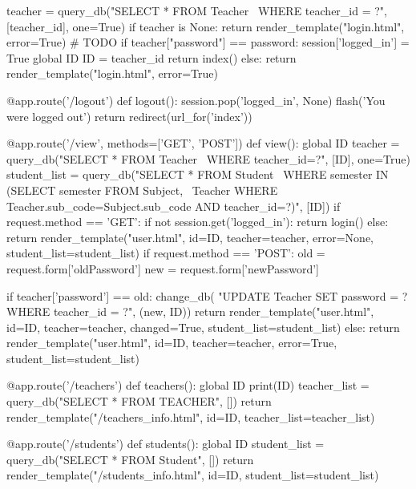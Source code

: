 \begin{python}
        teacher = query_db("SELECT * FROM Teacher \
                                WHERE teacher_id = ?",
                           [teacher_id],  one=True)
        if teacher is None:
            return render_template("login.html", error=True)
            # TODO
        if teacher["password"] == password:
            session['logged_in'] = True
            global ID
            ID = teacher_id
            return index()
        else:
            return render_template("login.html", error=True)


@app.route('/logout')
def logout():
    session.pop('logged_in', None)
    flash('You were logged out')
    return redirect(url_for('index'))


@app.route('/view', methods=['GET', 'POST'])
def view():
    global ID
    teacher = query_db("SELECT * FROM Teacher \
                         WHERE teacher_id=?", [ID], one=True)
    student_list = query_db("SELECT * FROM Student \
                             WHERE semester IN (SELECT semester FROM Subject, \
                             Teacher WHERE Teacher.sub_code=Subject.sub_code AND teacher_id=?)", [ID])
    if request.method == 'GET':
        if not session.get('logged_in'):
            return login()
        else:
            return render_template("user.html", id=ID, teacher=teacher, error=None, student_list=student_list)
    if request.method == 'POST':
        old = request.form['oldPassword']
        new = request.form['newPassword']

        if teacher['password'] == old:
            change_db(
                "UPDATE Teacher SET password = ? WHERE teacher_id = ?", (new, ID))
            return render_template("user.html", id=ID,
                                   teacher=teacher, changed=True,  student_list=student_list)
        else:
            return render_template("user.html", id=ID,
                                   teacher=teacher, error=True,  student_list=student_list)


@app.route('/teachers')
def teachers():
    global ID
    print(ID)
    teacher_list = query_db("SELECT * FROM TEACHER", [])
    return render_template("/teachers_info.html", id=ID,
                           teacher_list=teacher_list)


@app.route('/students')
def students():
    global ID
    student_list = query_db("SELECT * FROM Student", [])
    return render_template("/students_info.html", id=ID,
                           student_list=student_list)



\end{python}
